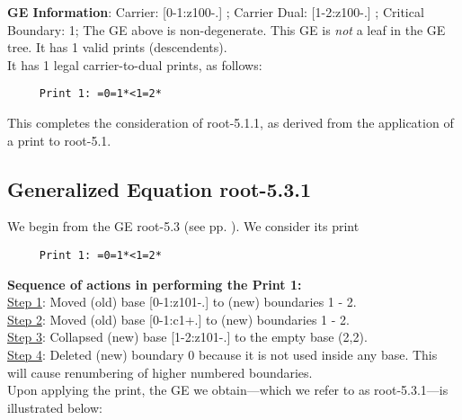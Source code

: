 \documentclass[final]{article}
\begin{document}
{\bf GE Information}:  
Carrier: [0-1:z100-.] ;  
Carrier Dual: [1-2:z100-.] ;  
Critical Boundary: 1;  
The GE above is non-degenerate.  This GE is {\em not} a leaf in the GE tree.   It has 1 valid prints (descendents).  \\[0.1in]
   It has 1 legal carrier-to-dual prints, as follows:
\begin{verbatim}
     Print 1: =0=1*<1=2*
\end{verbatim}
This completes the consideration of root-5.1.1, as derived from the application of a print to root-5.1.\\[0.1in]
\subsection*{Generalized Equation root-5.3.1}
\label{root-5.3.1}We begin from the GE root-5.3 (see pp. \pageref{root-5.3}).  {We consider its print}
\begin{verbatim}
     Print 1: =0=1*<1=2*
\end{verbatim}
{\bf Sequence of actions in performing the Print 1:}\\
{\underline{Step 1}:} Moved (old) base [0-1:z101-.]  to (new) boundaries 1 - 2.\\
{\underline{Step 2}:} Moved (old) base [0-1:c1+.]  to (new) boundaries 1 - 2.\\
{\underline{Step 3}:} Collapsed (new) base [1-2:z101-.]  to the empty base (2,2).
\\
{\underline{Step 4}:} Deleted (new) boundary 0 because it is not used inside any base.  This will cause renumbering of higher numbered boundaries.
\\[0.1in]
{Upon applying the print, the GE we obtain---which we refer to as root-5.3.1---is illustrated below:}
\end{document}
